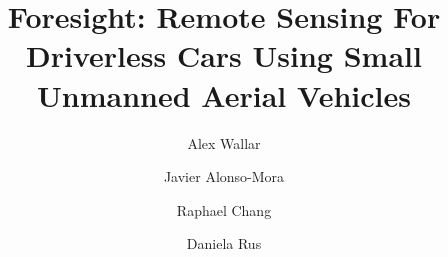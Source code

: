 \documentclass[letterpaper, 10pt, conference]{ieeeconf}
\begin{document}
\title{Foresight: Remote Sensing For Driverless Cars Using Small
Unmanned Aerial Vehicles}


\author{Alex Wallar \and Javier Alonso-Mora \and Raphael Chang
\and Daniela Rus}

\maketitle

\begin{abstract}

\end{abstract}
















\end{document}
